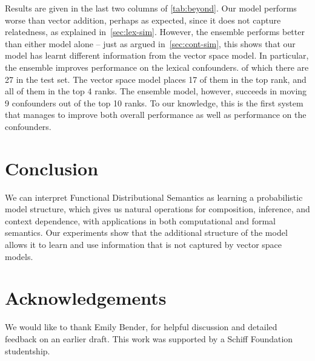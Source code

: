 \documentclass[a4paper,11pt]{article}
\begin{document}
Results are given in the last two columns of \cref{tab:beyond}.
Our model performs worse than vector addition,
perhaps as expected, since it does not capture relatedness,
as explained in~\cref{sec:lex-sim}.
However, the ensemble performs better than either model alone --
just as argued in~\cref{sec:cont-sim},
this shows that our model has learnt different information from the vector space model.
In particular, the ensemble improves performance on the lexical confounders.
of which there are 27 in the test set.
The vector space model places 17 of them in the top rank,
and all of them in the top 4 ranks.
The ensemble model, however, succeeds in moving 9 confounders out of the top 10 ranks.
To our knowledge, this is the first system that manages to improve both overall performance
as well as performance on the confounders.


\section{Conclusion}

We can interpret Functional Distributional Semantics as learning a probabilistic model structure,
which gives us natural operations for composition, inference, and context dependence,
with applications in both computational and formal semantics.
Our experiments show that the additional structure of the model
allows it to learn and use information that is not captured by vector space models.

\pagebreak

\section*{Acknowledgements}

We would like to thank Emily Bender,
for helpful discussion and detailed feedback on an earlier draft.
This work was supported by a Schiff Foundation studentship.




\end{document}
